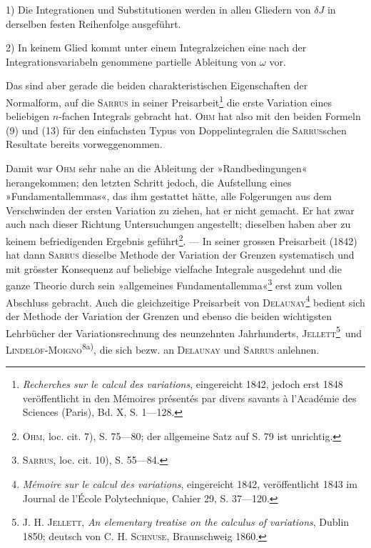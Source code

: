 1) Die Integrationen und Substitutionen werden in allen Gliedern von $\delta J$
in derselben festen Reihenfolge ausgeführt.

2) In keinem Glied kommt unter einem Integralzeichen eine nach der
Integrationsvariabeln genommene partielle Ableitung von $\omega$ vor.

Das sind aber gerade die beiden charakteristischen Eigenschaften der
Normalform, auf die \textsc{Sarrus} in seiner Preisarbeit\footnote{\textit{Recherches sur le calcul des variations}, eingereicht 1842, jedoch erst 1848 veröffentlicht in den Mémoires présentés par divers savants à l’Académie des Sciences (Paris), Bd. X, S. 1—128.} die erste Variation eines
beliebigen $n$-fachen Integrals gebracht hat. \textsc{Ohm} hat also mit den beiden
Formeln (9) und (13) für den einfachsten Typus von Doppelintegralen die
\textsc{Sarrus}schen Resultate bereits vorweggenommen.

Damit war \textsc{Ohm} sehr nahe an die Ableitung der »Randbedingungen«
herangekommen; den letzten Schritt jedoch, die Aufstellung eines »Fundamentallemmas«,
das ihm gestattet hätte, alle Folgerungen aus dem Verschwinden
der ersten Variation zu ziehen, hat er nicht gemacht. Er hat zwar auch nach
dieser Richtung Untersuchungen angestellt; dieselben haben aber zu keinem
befriedigenden Ergebnis geführt\footnote{\textsc{Ohm}, loc. cit. 7), S. 75—80; der allgemeine Satz auf S. 79 ist unrichtig.}. — In seiner grossen Preisarbeit (1842) hat
dann \textsc{Sarrus} dieselbe Methode der Variation der Grenzen systematisch und
mit grösster Konsequenz auf beliebige vielfache Integrale ausgedehnt und die
ganze Theorie durch sein »allgemeines Fundamentallemma«\footnote{\textsc{Sarrus}, loc. cit. 10), S. 55—84.} erst zum vollen
Abschluss gebracht. Auch die gleichzeitige Preisarbeit von \textsc{Delaunay}\footnote{\textit{Mémoire sur le calcul des variations}, eingereicht 1842, veröffentlicht 1843 im Journal de l’École Polytechnique, Cahier 29, S. 37—120.} bedient
sich der Methode der Variation der Grenzen und ebenso die beiden
wichtigsten Lehrbücher der Variationsrechnung des neunzehnten Jahrhunderts,
\textsc{Jellett}\begingroup\renewcommand{\thefootnote}{13a)}\footnote{\textsc{J. H. Jellett}, \textit{An elementary treatise on the calculus of variations}, Dublin 1850; deutsch von \textsc{C. H. Schnuse}, Braunschweig 1860.}\endgroup\setcounter{footnote}{13}\ und \textsc{Lindelöf-Moigno}\textsuperscript{8a)}, die sich bezw. an \textsc{Delaunay} und \textsc{Sarrus}
anlehnen.
\par\clearpage\endgroup

